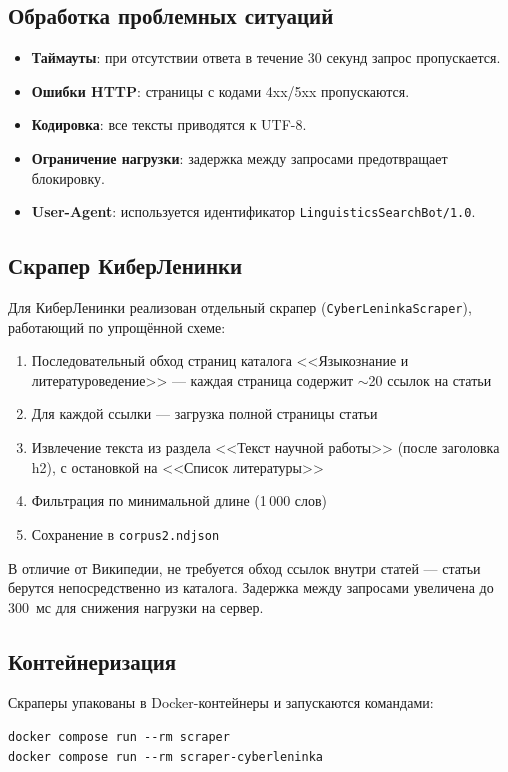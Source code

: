\subsection{Обработка проблемных ситуаций}

\begin{itemize}
    \item \textbf{Таймауты}: при отсутствии ответа в течение 30 секунд запрос пропускается.
    \item \textbf{Ошибки HTTP}: страницы с кодами 4xx/5xx пропускаются.
    \item \textbf{Кодировка}: все тексты приводятся к UTF-8.
    \item \textbf{Ограничение нагрузки}: задержка между запросами предотвращает блокировку.
    \item \textbf{User-Agent}: используется идентификатор \texttt{LinguisticsSearchBot/1.0}.
\end{itemize}

\subsection{Скрапер КиберЛенинки}

Для КиберЛенинки реализован отдельный скрапер (\texttt{CyberLeninkaScraper}), работающий по упрощённой схеме:
\begin{enumerate}
    \item Последовательный обход страниц каталога <<Языкознание и литературоведение>> --- каждая страница содержит $\sim$20 ссылок на статьи
    \item Для каждой ссылки --- загрузка полной страницы статьи
    \item Извлечение текста из раздела <<Текст научной работы>> (после заголовка h2), с остановкой на <<Список литературы>>
    \item Фильтрация по минимальной длине (1\,000 слов)
    \item Сохранение в \texttt{corpus2.ndjson}
\end{enumerate}

В отличие от Википедии, не требуется обход ссылок внутри статей --- статьи берутся непосредственно из каталога. Задержка между запросами увеличена до 300~мс для снижения нагрузки на сервер.

\subsection{Контейнеризация}

Скраперы упакованы в Docker-контейнеры и запускаются командами:
\begin{verbatim}
docker compose run --rm scraper
docker compose run --rm scraper-cyberleninka
\end{verbatim}

